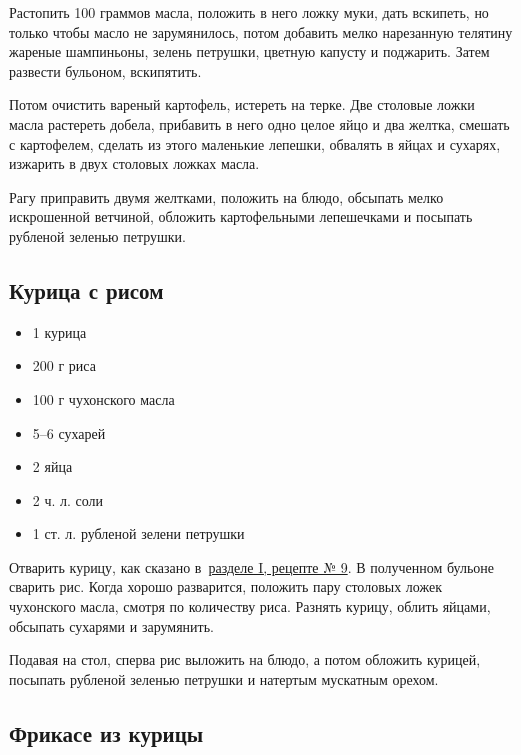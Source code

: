 Растопить 100 граммов масла, положить в него ложку муки, дать вскипеть, но только чтобы масло не зарумянилось, потом добавить мелко нарезанную телятину жареные шампиньоны, зелень петрушки, цветную капусту и поджарить. Затем развести бульоном, вскипятить.

Потом очистить вареный картофель, истереть на терке. Две столовые ложки масла растереть добела, прибавить в него одно целое яйцо и два желтка, смешать с картофелем, сделать из этого маленькие лепешки, обвалять в яйцах и сухарях, изжарить в двух столовых ложках масла.

Рагу приправить двумя желтками, положить на блюдо, обсыпать мелко искрошенной ветчиной, обложить картофельными лепешечками и посыпать рубленой зеленью петрушки.

\subsection{Курица с рисом}

\begin{itemize}
	\item 1 курица 
    \item 200 г риса
    \item 100 г чухонского масла
    \item 5–6 сухарей
    \item 2 яйца
    \item 2 ч. л. соли 
    \item 1 ст. л. рубленой зелени петрушки
\end{itemize}

Отварить курицу, как сказано в~\hyperref[9sup-kur]{разделе I, рецепте № 9}. В полученном бульоне сварить рис. Когда хорошо разварится, положить пару столовых ложек чухонского масла, смотря по количеству риса. Разнять курицу, облить яйцами, обсыпать сухарями и зарумянить.

Подавая на стол, сперва рис выложить на блюдо, а потом обложить курицей, посыпать рубленой зеленью петрушки и натертым мускатным орехом.

\subsection{Фрикасе из курицы}

